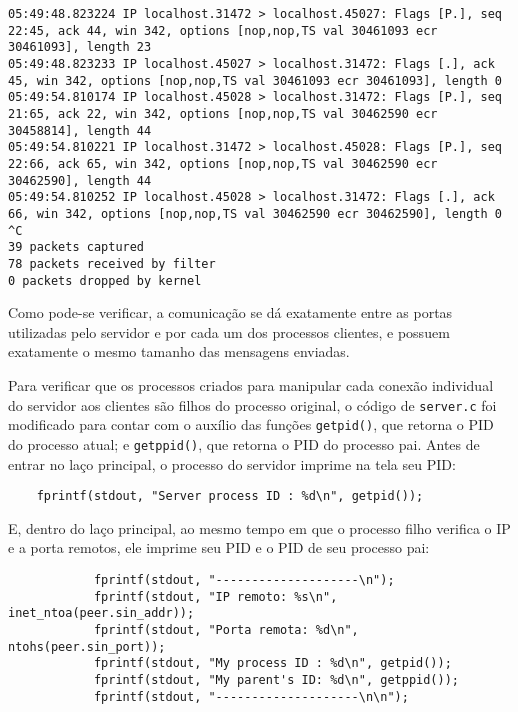 \documentclass[a4paper,10pt]{article}
\begin{document}
\begin{lstlisting}
05:49:48.823224 IP localhost.31472 > localhost.45027: Flags [P.], seq 22:45, ack 44, win 342, options [nop,nop,TS val 30461093 ecr 30461093], length 23
05:49:48.823233 IP localhost.45027 > localhost.31472: Flags [.], ack 45, win 342, options [nop,nop,TS val 30461093 ecr 30461093], length 0
05:49:54.810174 IP localhost.45028 > localhost.31472: Flags [P.], seq 21:65, ack 22, win 342, options [nop,nop,TS val 30462590 ecr 30458814], length 44
05:49:54.810221 IP localhost.31472 > localhost.45028: Flags [P.], seq 22:66, ack 65, win 342, options [nop,nop,TS val 30462590 ecr 30462590], length 44
05:49:54.810252 IP localhost.45028 > localhost.31472: Flags [.], ack 66, win 342, options [nop,nop,TS val 30462590 ecr 30462590], length 0
^C
39 packets captured
78 packets received by filter
0 packets dropped by kernel

\end{lstlisting}

Como pode-se verificar, a comunicação se dá exatamente entre as portas utilizadas pelo servidor e por cada um dos processos clientes, e possuem exatamente o mesmo tamanho das mensagens enviadas.

Para verificar que os processos criados para manipular cada conexão individual do servidor aos clientes são filhos do processo original, o código de {\tt server.c} foi modificado para contar com o auxílio das funções {\tt getpid()}, que retorna o PID do processo atual; e {\tt getppid()}, que retorna o PID do processo pai. Antes de entrar no laço principal, o processo do servidor imprime na tela seu PID:

\begin{lstlisting}
    fprintf(stdout, "Server process ID : %d\n", getpid());

\end{lstlisting}

E, dentro do laço principal, ao mesmo tempo em que o processo filho verifica o IP e a porta remotos, ele imprime seu PID e o PID de seu processo pai:

\begin{lstlisting}
            fprintf(stdout, "--------------------\n");
            fprintf(stdout, "IP remoto: %s\n", inet_ntoa(peer.sin_addr));
            fprintf(stdout, "Porta remota: %d\n", ntohs(peer.sin_port));
            fprintf(stdout, "My process ID : %d\n", getpid());
            fprintf(stdout, "My parent's ID: %d\n", getppid());
            fprintf(stdout, "--------------------\n\n");

\end{lstlisting}
\end{document}
